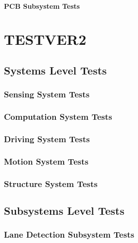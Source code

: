 \documentclass[a4paper,12pt]{article}
\begin{document}
	\paragraph{PCB Subsystem Tests}
	
	\newpage
\section{TESTVER2}
	
	
	\subsection{Systems Level Tests}	
	

	\subsubsection{Sensing System Tests}

	 
	 
	
	\subsubsection{Computation System Tests}
	
	
	
	\subsubsection{Driving System Tests}
	
	


	\subsubsection{Motion System Tests}
	
	
	
	
	\subsubsection{Structure System Tests}
	
	
	
	
	
	
	\newpage
	\subsection{Subsystems Level Tests}	
		

	\subsubsection{Lane Detection Subsystem Tests}	
	
\end{document}
